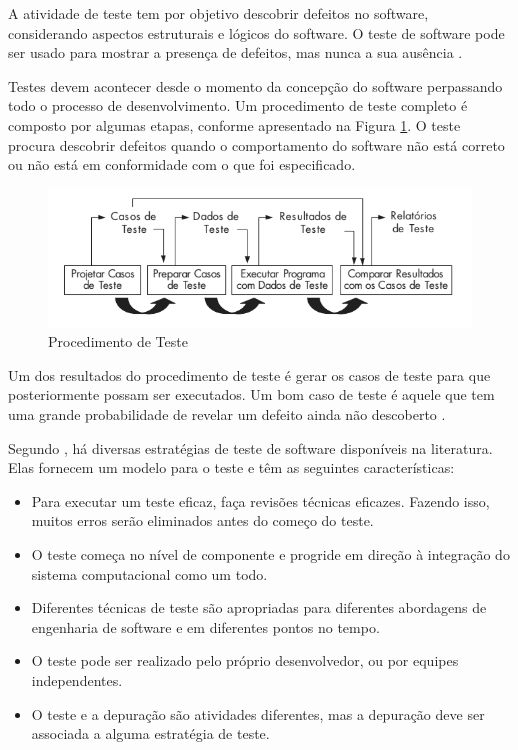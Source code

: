 A atividade de teste tem por objetivo descobrir defeitos no software, considerando aspectos estruturais e lógicos do software. O teste de software pode ser usado para mostrar a presença de defeitos, mas nunca a sua ausência \cite{HIRAMA2011}.

Testes devem acontecer desde o momento da concepção do software perpassando todo o processo de desenvolvimento. Um procedimento de teste completo é composto por algumas etapas, conforme apresentado na Figura \ref{figure:PTESTE}. O teste procura descobrir defeitos quando o comportamento do software não está correto ou não está em conformidade com o que foi especificado.

\begin{figure}[!htb]
\centering
\includegraphics[width=.8\textwidth]{images/PTESTE.png}
\caption{Procedimento de Teste \cite{HIRAMA2011}}
\label{figure:PTESTE}
\end{figure}

Um dos resultados do procedimento de teste é gerar os casos de teste para que posteriormente possam ser executados.  Um bom caso de teste é aquele que tem uma grande probabilidade de revelar um defeito ainda não descoberto \cite{HIRAMA2011}.

Segundo , há diversas estratégias de teste de software disponíveis na literatura. Elas fornecem um modelo para o teste e têm as seguintes características:

\begin{itemize}
    \item Para executar um teste eficaz, faça revisões técnicas eficazes. Fazendo isso, muitos erros serão eliminados antes do começo do teste.
    \item O teste começa no nível de componente e progride em direção à integração do sistema computacional como um todo.
    \item Diferentes técnicas de teste são apropriadas para diferentes abordagens de engenharia de software e em diferentes pontos no tempo.
    \item O teste pode ser realizado pelo próprio desenvolvedor, ou por equipes independentes.
    \item O teste e a depuração são atividades diferentes, mas a depuração deve ser associada a alguma estratégia de teste.
\end{itemize}

